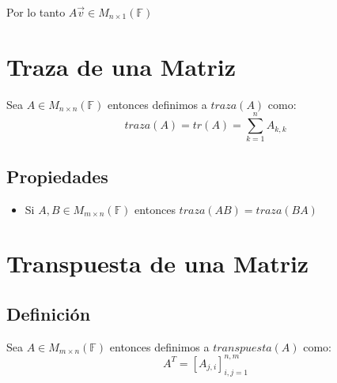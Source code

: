 \documentclass[12pt]{report}                                    %
\newcommand{\Brackets}[1]{\left[ #1 \right]}                    %
\begin{document}
                Por lo tanto $A\vec{v} \in M_{n \times 1}(\mathbb{F})$



        \clearpage
        \section{Traza de una Matriz}

            Sea $A \in M_{n \times n}(\mathbb{F})$ entonces definimos a $traza(A)$ como:
            \begin{equation}
                traza(A) = tr(A) = \sum_{k=1}^{n} A_{k, k}
            \end{equation}


            \subsection{Propiedades}

                \begin{itemize}
                    \item Si $A, B \in M_{m \times n}(\mathbb{F})$ entonces $traza(AB) = traza(BA)$
                \end{itemize}




        \clearpage
        \section{Transpuesta de una Matriz}

            \subsection{Definición}

                Sea $A \in M_{m \times n}(\mathbb{F})$ entonces definimos a $transpuesta(A)$ como:
                \begin{equation}
                    A^T = \Brackets{ A_{j, i} }_{i, j = 1}^{n, m}
                \end{equation}
\end{document}
